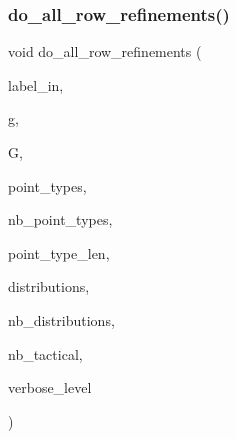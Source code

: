 \subsubsection{\texorpdfstring{do\+\_\+all\+\_\+row\+\_\+refinements()}{do\_all\_row\_refinements()}}
{\footnotesize\ttfamily void do\+\_\+all\+\_\+row\+\_\+refinements (\begin{DoxyParamCaption}\item[{\mbox{\hyperlink{galois_8h_ab6cc7b4aeb6ea31aba2b3fbfc83ff5e6}{B\+Y\+TE}} $\ast$}]{label\+\_\+in,  }\item[{ofstream \&}]{g,  }\item[{\mbox{\hyperlink{classtdo__scheme}{tdo\+\_\+scheme}} \&}]{G,  }\item[{\mbox{\hyperlink{galois_8h_a09fddde158a3a20bd2dcadb609de11dc}{I\+NT}} $\ast$}]{point\+\_\+types,  }\item[{\mbox{\hyperlink{galois_8h_a09fddde158a3a20bd2dcadb609de11dc}{I\+NT}}}]{nb\+\_\+point\+\_\+types,  }\item[{\mbox{\hyperlink{galois_8h_a09fddde158a3a20bd2dcadb609de11dc}{I\+NT}}}]{point\+\_\+type\+\_\+len,  }\item[{\mbox{\hyperlink{galois_8h_a09fddde158a3a20bd2dcadb609de11dc}{I\+NT}} $\ast$}]{distributions,  }\item[{\mbox{\hyperlink{galois_8h_a09fddde158a3a20bd2dcadb609de11dc}{I\+NT}}}]{nb\+\_\+distributions,  }\item[{\mbox{\hyperlink{galois_8h_a09fddde158a3a20bd2dcadb609de11dc}{I\+NT}} \&}]{nb\+\_\+tactical,  }\item[{\mbox{\hyperlink{galois_8h_a09fddde158a3a20bd2dcadb609de11dc}{I\+NT}}}]{verbose\+\_\+level }\end{DoxyParamCaption})}

\mbox{\label{tdo__refine__all_8_c_aad499b1b3eae7f9bc967c96eec7abce8}} 
